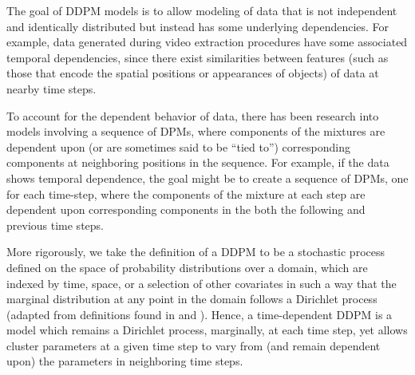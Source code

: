 \documentclass[twocolumn, final]{svjour3}
\begin{document}
The goal of DDPM models is to allow modeling of data that is not independent and identically distributed but instead has some underlying dependencies. For example, data generated during video extraction procedures have some associated temporal dependencies, since there exist similarities between features (such as those that encode the spatial positions or appearances of objects) of data at nearby time steps.

To account for the dependent behavior of data, there has been research into models involving a sequence of DPMs, where components of the mixtures are dependent upon (or are sometimes said to be ``tied to'') corresponding components at neighboring positions in the sequence. For example, if the data shows temporal dependence, the goal might be to create a sequence of DPMs, one for each time-step, where the components of the mixture at each step are dependent upon corresponding components in the both the following and previous time steps.

More rigorously, we take the definition of a DDPM to be a stochastic process defined on the space of probability distributions over a domain, which are indexed by time, space, or a selection of other covariates in such a way that the marginal distribution at any point in the domain follows a Dirichlet process (adapted from definitions found in \cite{gasthaus_thesis} and \cite{griffin2006order}). Hence, a time-dependent DDPM is a model which remains a Dirichlet process, marginally, at each time step, yet allows cluster parameters at a given time step to vary from (and remain dependent upon) the parameters in neighboring time steps.



\end{document}
